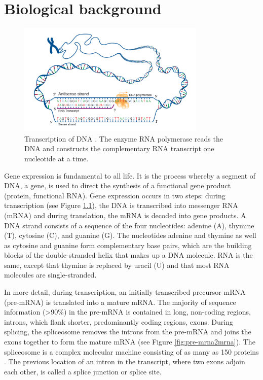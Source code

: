 \chapter{\label{ch:2-litreview}Biological background} %

\minitoc
\begin{figure}[h]
	\centering\includegraphics[width=0.8\textwidth]{../visualizations/ch2-biobackground/transcription.jpg} 
	\caption
	{Transcription of DNA \cite{img:transcription}. The enzyme RNA polymerase reads the DNA and constructs the complementary RNA transcript one nucleotide at a time. 
	}
	\label{fig:transcription}
\end{figure}


Gene expression is fundamental to all life. It is the process whereby a segment of DNA, a gene, is used to direct the synthesis of a functional gene product (protein, functional RNA). Gene expression occurs in two steps: during transcription (see Figure \ref{fig:transcription}), the DNA is transcribed into messenger RNA (mRNA) and during translation, the mRNA is decoded into gene products. A DNA strand consists of a sequence of the four nucleotides: adenine (A), thymine (T), cytosine (C), and guanine (G). The nucleotides adenine and thymine as well as cytosine and guanine form complementary base pairs, which are the building blocks of the double-stranded helix that makes up a DNA molecule. RNA is the same, except that thymine is replaced by uracil (U) and that most RNA molecules are single-stranded.


In more detail, during transcription, an initially transcribed precursor mRNA (pre-mRNA) is translated into a mature mRNA. 
The majority of sequence information (>90\%) in the pre-mRNA is contained in long, non-coding regions, introns, which flank shorter, predominantly coding regions, exons. 
During splicing, the spliceosome removes the introns from the pre-mRNA and joins the exons together to form the mature mRNA (see Figure \ref{fig:pre-mrna2mrna}). The spliceosome is a complex molecular machine consisting of as many as 150 proteins \cite{splicing_current_perspectives}. The previous location of an intron in the transcript, where two exons adjoin each other, is called a splice junction or splice site.


